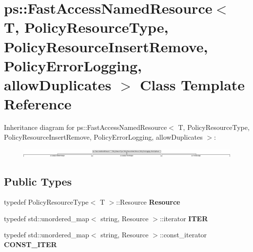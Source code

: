 \hypertarget{classps_1_1FastAccessNamedResource}{}\section{ps\+:\+:Fast\+Access\+Named\+Resource$<$ T, Policy\+Resource\+Type, Policy\+Resource\+Insert\+Remove, Policy\+Error\+Logging, allow\+Duplicates $>$ Class Template Reference}
\label{classps_1_1FastAccessNamedResource}
Inheritance diagram for ps\+:\+:Fast\+Access\+Named\+Resource$<$ T, Policy\+Resource\+Type, Policy\+Resource\+Insert\+Remove, Policy\+Error\+Logging, allow\+Duplicates $>$\+:\begin{figure}[H]
\begin{center}
\leavevmode
\includegraphics[height=0.501119cm]{classps_1_1FastAccessNamedResource}
\end{center}
\end{figure}
\subsection*{Public Types}
\begin{DoxyCompactItemize}
\item 
\hypertarget{classps_1_1FastAccessNamedResource_a6af3539e0c649fd152cb382331d49c05}{}typedef Policy\+Resource\+Type$<$ T $>$\+::Resource {\bfseries Resource}\label{classps_1_1FastAccessNamedResource_a6af3539e0c649fd152cb382331d49c05}

\item 
\hypertarget{classps_1_1FastAccessNamedResource_aac61fb6378f6c21cc01f315677339498}{}typedef std\+::unordered\+\_\+map$<$ string, Resource $>$\+::iterator {\bfseries I\+T\+E\+R}\label{classps_1_1FastAccessNamedResource_aac61fb6378f6c21cc01f315677339498}

\item 
\hypertarget{classps_1_1FastAccessNamedResource_a01908e03a2c91705ca74bb5ef6a955cb}{}typedef std\+::unordered\+\_\+map$<$ string, Resource $>$\+::const\+\_\+iterator {\bfseries C\+O\+N\+S\+T\+\_\+\+I\+T\+E\+R}\label{classps_1_1FastAccessNamedResource_a01908e03a2c91705ca74bb5ef6a955cb}

\end{DoxyCompactItemize}
